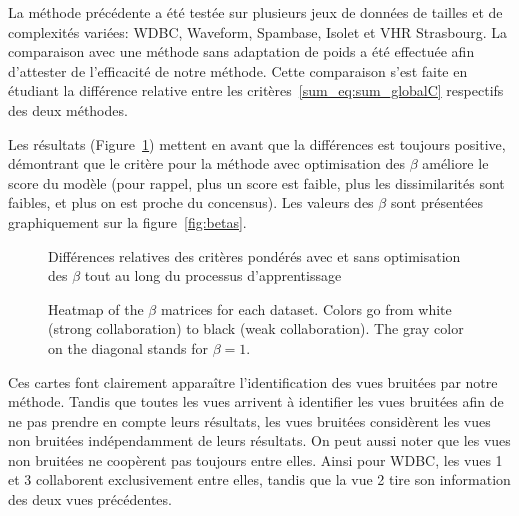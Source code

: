 La méthode précédente a été testée sur plusieurs jeux de données de tailles et de complexités variées: WDBC, Waveform, Spambase, Isolet et VHR Strasbourg. La comparaison avec une méthode sans adaptation de poids a été effectuée afin d'attester de l'efficacité de notre méthode. Cette comparaison s'est faite en étudiant la différence relative entre les critères~\ref{sum_eq:sum_globalC} respectifs des deux méthodes. 

Les résultats (Figure~\ref{sum_fig:relative_difference}) mettent en avant que la différences est toujours positive, démontrant que le critère pour la méthode avec optimisation des $\beta$ améliore le score du modèle (pour rappel, plus un score est faible, plus les dissimilarités sont faibles, et plus on est proche du concensus). Les valeurs des $\beta$ sont présentées graphiquement sur la figure~\ref{fig:betas}.

\begin{figure}[!h]
	\centering
	\caption{Différences relatives des critères pondérés avec et sans optimisation des $\beta$ tout au long du processus d'apprentissage}
\label{sum_fig:relative_difference}
\end{figure}

\begin{figure}[!h]
	\centering
	\caption{Heatmap of the $\beta$ matrices for each dataset. Colors go from white (strong collaboration) to black (weak collaboration). The gray color on the diagonal stands for $\beta=1$.}
\label{sum_fig:betas}
\end{figure}

Ces cartes font clairement apparaître l'identification des vues bruitées par notre méthode. Tandis que toutes les vues arrivent à identifier les vues bruitées afin de ne pas prendre en compte leurs résultats, les vues bruitées considèrent les vues non bruitées indépendamment de leurs résultats. On peut aussi noter que les vues non bruitées ne coopèrent pas toujours entre elles. Ainsi pour WDBC, les vues 1 et 3 collaborent exclusivement entre elles, tandis que la vue 2 tire son information des deux vues précédentes.

